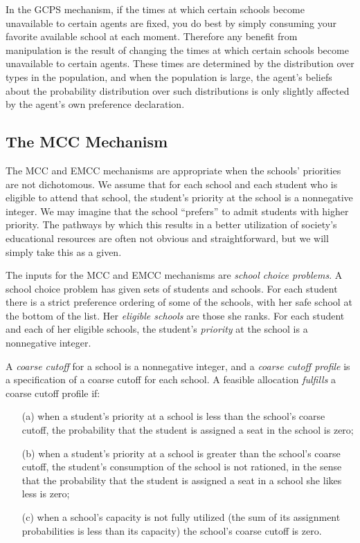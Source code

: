 \documentclass[12pt]{article}
\theoremstyle{definition}
\begin{document}
In the GCPS mechanism, if the times at which certain schools become
unavailable to certain agents are fixed, you do best by simply
consuming your favorite available school at each moment.  Therefore any
benefit from manipulation is the result of changing the times at which
certain schools become unavailable to certain agents.  These times are
determined by the distribution over types in the population, and when
the population is large, the agent's beliefs about the probability
distribution over such distributions is only slightly affected by the
agent's own preference declaration.

\subsection{The MCC Mechanism}

The MCC and EMCC mechanisms are appropriate when the schools'
priorities are not dichotomous.  We assume that for each school and
each student who is eligible to attend that school, the student's
priority at the school is a nonnegative integer.  We may imagine that
the school ``prefers'' to admit students with higher priority.  The
pathways by which this results in a better utilization of society's
educational resources are often not obvious and straightforward, but
we will simply take this as a given.

The inputs for the MCC and EMCC mechanisms are \emph{school choice
problems}.  A school choice problem has given sets of students and
schools.  For each student there is a strict preference ordering of
some of the schools, with her safe school at the bottom of the list.
Her \emph{eligible schools} are those she ranks.  For each student and
each of her eligible schools, the student's \emph{priority} at the
school is a nonnegative integer.

A \emph{coarse cutoff} for a school is a nonnegative integer, and a
\emph{coarse cutoff profile} is a specification of a coarse cutoff for
each school.  A feasible allocation \emph{fulfills} a coarse cutoff profile if:
\begin{enumerate}
  \item[(a)] when a student's priority at a school is less than the
    school's coarse cutoff, the probability that the student is
    assigned a seat in the school is zero;
  \item[(b)] when a student's priority at a school is greater than the
    school's coarse cutoff, the student's consumption of the school is
    not rationed, in the sense that the probability that the student
    is assigned a seat in a school she likes less is zero;
  \item[(c)] when a school's capacity is not fully utilized (the sum
    of its assignment probabilities is less than its capacity) the
    school's coarse cutoff is zero.
\end{enumerate}
 
\end{document}
